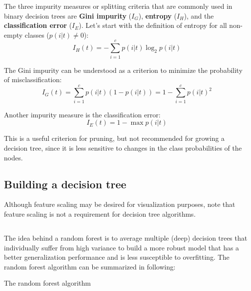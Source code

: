 The three impurity measures or splitting criteria that are commonly used in binary decision trees are \textbf{Gini impurity} ($I_G$), \textbf{entropy} ($I_H$), and the \textbf{classification error} ($I_E$). Let's start with the definition of entropy for all non-empty classes ($p(i|t)\neq 0$):
\begin{equation}
    I_H(t)=-\sum_{i=1}^{c}p(i|t)\log_2p(i|t)
\end{equation}

The Gini impurity can be understood as a criterion to minimize the probability of misclassification:
\begin{equation}
    I_G(t)=\sum_{i=1}^{c}p(i|t)(1-p(i|t))=1-\sum_{i=1}^{c}p(i|t)^2
\end{equation}

Another impurity measure is the classification error:
\begin{equation}
    I_E(t) = 1 - \max{p(i|t)}
\end{equation}

This is a useful criterion for pruning, but not recommended for growing a decision tree, since it is less sensitive to changes in the class probabilities of the nodes.

\subsection{Building a decision tree}
Although feature scaling may be desired for visualization purposes, note that feature scaling is not a requirement for decision tree algorithms.
\subsection{}
The idea behind a random forest is to average multiple (deep) decision trees that individually suffer from high variance to build a more robust model that has a better generalization performance and is less susceptible to overfitting. The random forest algorithm can be summarized in following:

\begin{algorithm}
    \caption{The random forest algorithm}
\end{algorithm}
